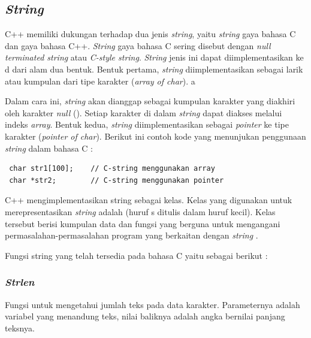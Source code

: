 \documentclass{subfiles}
\begin{document}
    \subsection{\textit{String}}
    C++ memiliki dukungan terhadap dua jenis \textit{string}, yaitu \textit{string} gaya bahasa C dan gaya bahasa C++. \textit{String} gaya bahasa C sering disebut dengan \textit{null terminated string} atau \textit{C-style string}. \textit{String} jenis ini dapat diimplementasikan ke d dari alam dua bentuk. Bentuk pertama, \textit{string} diimplementasikan sebagai larik atau \hspace{0.25ex} kumpulan \hspace{0.25ex} dari tipe \hspace{0.25ex} karakter \hspace{0.25ex} (\textit{array of char}).
    \newpage
    {\color{white}a\vspace*{-2.4ex}}

    \noindent Dalam cara ini, \textit{string} akan dianggap sebagai kumpulan karakter yang diakhiri oleh karakter \textit{null} (). Setiap karakter di dalam \textit{string} dapat diakses melalui indeks \textit{array}. Bentuk kedua, \textit{string} diimplementasikan sebagai \textit{pointer} ke tipe karakter (\textit{pointer  of char}). Berikut ini contoh kode yang menunjukan penggunaan \textit{string} dalam bahasa C \parencite{raharjo2015pemrograman}:
\begin{lstlisting}
 char str1[100];    // C-string menggunakan array
 char *str2;        // C-string menggunakan pointer
\end{lstlisting}

    C++ mengimplementasikan string sebagai kelas. Kelas yang digunakan untuk merepresentasikan \textit{string} adalah (huruf s ditulis dalam huruf kecil). Kelas tersebut berisi kumpulan data dan fungsi yang berguna untuk mengangani permasalahan-permasalahan program yang berkaitan dengan \textit{string} \parencite{raharjo2015pemrograman}.

    Fungsi string yang telah tersedia pada bahasa C yaitu sebagai berikut \parencite{sasongko2010modul}:
    \subsubsection{\textit{Strlen}}
    \begin{indentlevel0}
        Fungsi untuk mengetahui jumlah teks pada data karakter. Parameternya adalah variabel yang menandung teks, nilai baliknya adalah angka bernilai panjang teksnya.
    \end{indentlevel0}
\end{document}
